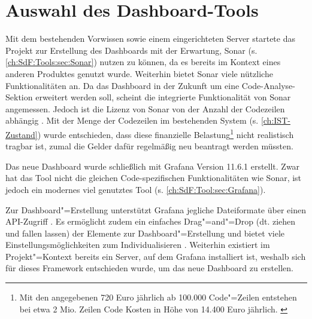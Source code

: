 \section{Auswahl des Dashboard-Tools}
\label{ch:Dashboard:sec:Tooling}
Mit dem bestehenden Vorwissen sowie einem eingerichteten Server startete das Projekt zur Erstellung des Dash\-boards mit der Erwartung, Sonar (s. \autoref{ch:SdF:Tools:sec:Sonar}) nutzen zu können, da es bereits im Kontext eines anderen Produktes genutzt wurde.
Weiterhin bietet Sonar viele nützliche Funktionalitäten an. Da das Dash\-board in der Zukunft um eine Code-Analyse-Sektion erweitert werden soll, scheint die integrierte Funktionalität von Sonar angemessen. Jedoch ist die Lizenz von Sonar von der Anzahl der Codezeilen abhängig \cite{Sonar:Plans_and_Pricing}. Mit der Menge der Codezeilen im bestehenden System (s. \autoref{ch:IST-Zustand}) wurde entschieden, dass diese finanzielle Belastung\footnote{Mit den angegebenen 720 Euro jährlich ab 100.000 Code"=Zeilen entstehen bei etwa 2 Mio. Zeilen Code Kosten in Höhe von 14.400 Euro jährlich. \cite{Sonar:Plans_and_Pricing}} nicht realistisch tragbar ist, zumal die Gelder dafür regelmäßig neu beantragt werden müssten.

Das neue Dash\-board wurde schließlich mit Grafana Version 11.6.1 erstellt. Zwar hat das Tool nicht die gleichen Code-spezifischen Funktionalitäten wie Sonar, ist jedoch ein modernes viel genutztes Tool (s. \autoref{ch:SdF:Tool:sec:Grafana}).

Zur Dash\-board"=Erstellung unterstützt Grafana jegliche Dateiformate über einen API-Zugriff \cite{MichelleTan:2023}.
Es ermöglicht zudem ein einfaches Drag"=and"=Drop (dt. ziehen und fallen lassen) der Elemente zur Dash\-board"=Erstellung und bietet viele Einstellungsmöglichkeiten zum Individualisieren \cite{Grafana:Create_a_Dashboard}. Weiterhin existiert im Projekt"=Kontext bereits ein Server, auf dem Grafana installiert ist, weshalb sich für dieses Framework entschieden wurde, um das neue Dashboard zu erstellen.

